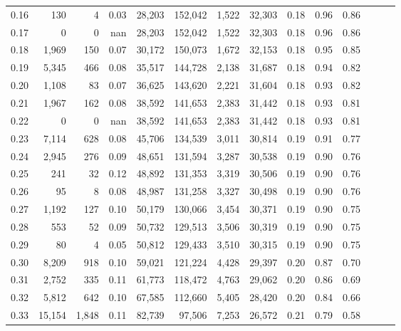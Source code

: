 \begin{tabular}{rrrrrrrrrrrrrr}
0.16 &     130 &      4 &  0.03 &   28,203 &  152,042 &   1,522 &  32,303 &  0.18 &  0.96 &      0.86 \\
0.17 &       0 &      0 &   nan &   28,203 &  152,042 &   1,522 &  32,303 &  0.18 &  0.96 &      0.86 \\
0.18 &   1,969 &    150 &  0.07 &   30,172 &  150,073 &   1,672 &  32,153 &  0.18 &  0.95 &      0.85 \\
0.19 &   5,345 &    466 &  0.08 &   35,517 &  144,728 &   2,138 &  31,687 &  0.18 &  0.94 &      0.82 \\
0.20 &   1,108 &     83 &  0.07 &   36,625 &  143,620 &   2,221 &  31,604 &  0.18 &  0.93 &      0.82 \\
0.21 &   1,967 &    162 &  0.08 &   38,592 &  141,653 &   2,383 &  31,442 &  0.18 &  0.93 &      0.81 \\
0.22 &       0 &      0 &   nan &   38,592 &  141,653 &   2,383 &  31,442 &  0.18 &  0.93 &      0.81 \\
0.23 &   7,114 &    628 &  0.08 &   45,706 &  134,539 &   3,011 &  30,814 &  0.19 &  0.91 &      0.77 \\
0.24 &   2,945 &    276 &  0.09 &   48,651 &  131,594 &   3,287 &  30,538 &  0.19 &  0.90 &      0.76 \\
0.25 &     241 &     32 &  0.12 &   48,892 &  131,353 &   3,319 &  30,506 &  0.19 &  0.90 &      0.76 \\
0.26 &      95 &      8 &  0.08 &   48,987 &  131,258 &   3,327 &  30,498 &  0.19 &  0.90 &      0.76 \\
0.27 &   1,192 &    127 &  0.10 &   50,179 &  130,066 &   3,454 &  30,371 &  0.19 &  0.90 &      0.75 \\
0.28 &     553 &     52 &  0.09 &   50,732 &  129,513 &   3,506 &  30,319 &  0.19 &  0.90 &      0.75 \\
0.29 &      80 &      4 &  0.05 &   50,812 &  129,433 &   3,510 &  30,315 &  0.19 &  0.90 &      0.75 \\
0.30 &   8,209 &    918 &  0.10 &   59,021 &  121,224 &   4,428 &  29,397 &  0.20 &  0.87 &      0.70 \\
0.31 &   2,752 &    335 &  0.11 &   61,773 &  118,472 &   4,763 &  29,062 &  0.20 &  0.86 &      0.69 \\
0.32 &   5,812 &    642 &  0.10 &   67,585 &  112,660 &   5,405 &  28,420 &  0.20 &  0.84 &      0.66 \\
0.33 &  15,154 &  1,848 &  0.11 &   82,739 &   97,506 &   7,253 &  26,572 &  0.21 &  0.79 &      0.58 \\

\end{tabular}
